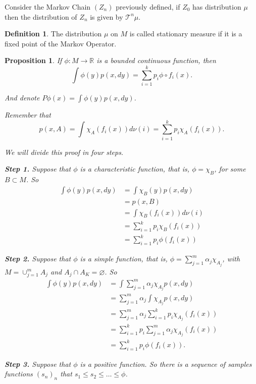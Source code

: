 \documentclass[a4paper]{article}
\theoremstyle{plain}
\newtheorem{prop} [theorem]{Proposition}
\theoremstyle{definition}
\newtheorem{defn}[theorem]{Definition}%
\begin{document}
    Consider the Markov Chain $(Z_n)$ previously defined, if $Z_0$ has distribution $\mu$ then the distribution of $Z_n$ is given by $\mathcal{T}^n \mu$.

    \begin{defn} The distribution $\mu$ on $M$ is called stationary measure if it is a fixed point of the Markov Operator.
    \end{defn}
    
    \begin{prop}
    If $\phi:M \to \mathbb{R}$ is a bounded continuous function, then 
    $$ \int \phi(y) p(x,dy) = \sum_{i=1}^{k}p_i \phi \circ f_i(x).$$

    And denote $P \phi(x) = \int \phi(y) p(x,dy)$.
    
    \proof Remember that 
    $$p(x,A) = \int \chi_A(f_i(x))d\nu(i) = \sum_{i=1}^{k}p_i \chi_A(f_i(x)).$$ 
    
    We will divide this proof in four steps. 

    \textbf{Step 1.} Suppose that $\phi$ is a characteristic function, that is, $\phi = \chi_B$, for some $B \subset M$. So
    \begin{align*}
        \int \phi(y) p(x,dy) &= \int \chi_B(y) p(x,dy) \\
        &=  p(x,B) \\
        &= \int \chi_B(f_i(x))d\nu(i)\\
        &= \sum_{i=1}^{k}p_i \chi_B(f_i(x))\\
        &= \sum_{i=1}^{k}p_i \phi(f_i(x))
    \end{align*}

    \textbf{Step 2.} Suppose that $\phi$ is a simple function, that is, 
    $\phi = \sum_{j=1}^{m} \alpha_j \chi_{A_j}$, with $M=\displaystyle\cup_{j=1}^{m} A_j$ and $A_j\cap A_K =\varnothing$. So 
    \begin{align*}
        \int \phi(y) p(x,dy) &= \int \sum_{j=1}^{m} \alpha_j \chi_{A_j} p(x,dy) \\
        &=  \sum_{j=1}^{m} \alpha_j  \int  \chi_{A_j} p(x,dy) \\
        &=  \sum_{j=1}^{m} \alpha_j  \sum_{i=1}^{k}p_i \chi_{A_j}(f_i(x)) \\
        &=  \sum_{i=1}^{k}p_i \sum_{j=1}^{m} \alpha_j \chi_{A_j}(f_i(x)) \\
        &= \sum_{i=1}^{k} p_i \phi(f_i(x)).
    \end{align*}

    \textbf{Step 3.} Suppose that $\phi$ is a positive function. So there is a sequence of samples functions $(s_n)_n$ that $s_1 \leq s_2 \leq \dots \leq \phi$. 


\end{prop}
\end{document}
